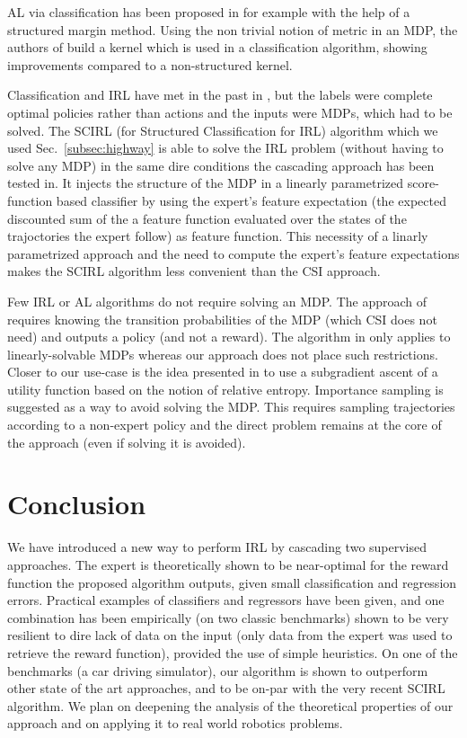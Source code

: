 \documentclass[smallextended]{svjour3}
\begin{document}
AL via classification has been proposed in for example \cite{ratliff2007imitation} with the help of a structured margin method. Using the non trivial notion of metric in an MDP, the authors of \cite{melo2010learning} build a kernel which is used
in a classification algorithm, showing improvements compared to a
non-structured kernel.

Classification and IRL have met in the past in \cite{ratliff2006maximum}, but the labels were complete optimal policies rather than actions and the inputs were MDPs, which had to be solved. The SCIRL (for Structured Classification for IRL) algorithm \cite{klein2012scirl} which we used Sec.~\ref{subsec:highway} is able to solve the IRL problem (without having to solve any MDP) in the same dire conditions the cascading approach has been tested in. It injects the structure of the MDP in a linearly parametrized score-function based classifier by using the expert's feature expectation (the expected discounted sum of the a feature function evaluated over the states of the trajoctories the expert follow) as feature function. This necessity of a linarly parametrized approach and the need to compute the expert's feature expectations makes the SCIRL algorithm less convenient than the CSI approach.

Few IRL or AL algorithms do not require solving an MDP. The approach of \cite{syed2008apprenticeship} requires knowing the transition probabilities of the MDP (which CSI does not need) and outputs a policy (and not a reward). The algorithm in \cite{dvijotham2010inverse} only applies to linearly-solvable MDPs whereas our approach does not place such restrictions. Closer to our use-case is the idea presented in \cite{boularias2011relative} to use a subgradient ascent of a utility function based on the notion of relative entropy. Importance sampling is suggested as a way to avoid solving the MDP. This requires sampling trajectories according to a non-expert policy and
the direct problem remains at the core of the approach (even if
solving it is avoided).


\section{Conclusion}
\label{sec:conclusion}
We have introduced a new way to perform IRL by cascading two supervised approaches. The expert is theoretically shown to be near-optimal for the reward function the proposed algorithm outputs, given small classification and regression errors. Practical examples of classifiers and regressors have been given, and one combination has been empirically (on two classic benchmarks) shown to be very resilient to dire lack of data on the input (only data from the expert was used to retrieve the reward function), provided the use of simple heuristics. On one of the benchmarks (a car driving simulator), our algorithm is shown to outperform other state of the art approaches, and to be on-par with the very recent SCIRL algorithm. We plan on deepening the analysis of the theoretical properties of our approach and on applying it to real world robotics problems.



\end{document}
